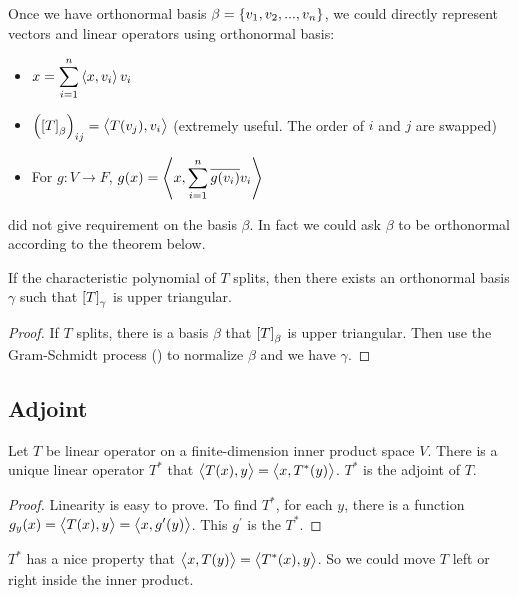 Once we have orthonormal basis $\beta = \set{v_1, v_2, ..., v_n}$,  we could directly represent vectors and linear operators using orthonormal basis:
\begin{itemize}
    \item $\displaystyle x = \sum_{i=1}^n \left\langle \displaystyle x, v_i \right\rangle v_i$
    \item $\left(\coordinate{T}_\beta\right)_{ij} = \innerproduct{T(v_j)}{v_i}$ (extremely useful. The order of $i$ and $j$ are swapped)
    \item For $g: V \rightarrow F$, $g(x) = \left\langle \displaystyle x, \sum_{i=1}^n \overline{g(v_i)} v_i \right\rangle$
\end{itemize}



 did not give requirement on the basis $\beta$. In fact we could ask $\beta$ to be orthonormal according to the theorem below.

\begin{theorem}[Schur]\label{schur_theorem}
    If the characteristic polynomial of $T$ splits, then there exists an orthonormal basis $\gamma$ such that $\coordinate{T}_\gamma$ is upper triangular.
\end{theorem}
\begin{proof}
    If $T$ splits, there is a basis $\beta$ that $\coordinate{T}_\beta$ is upper triangular. Then use the Gram-Schmidt process () to normalize $\beta$ and we have $\gamma$.
\end{proof}



\subsection{Adjoint}


\begin{definition}[Adjoint]\label{adjoint_operator_definition}
    Let $T$ be linear operator on a finite-dimension inner product space $V$. There is a unique linear operator $T^*$ that $\left\langle \displaystyle T(x), y \right\rangle = \left\langle \displaystyle x, T^* (y) \right\rangle$. $T^*$ is the adjoint of $T$.
\end{definition}
\begin{proof}
    Linearity is easy to prove. To find $T^*$, for each $y$, there is a function $g_y (x) = \left\langle \displaystyle T(x), y \right\rangle = \left\langle \displaystyle x, g^\prime (y) \right\rangle$. This $g^\prime$ is the $T^*$.
\end{proof}

$T^*$ has a nice property that $\left\langle \displaystyle x, T(y) \right\rangle = \left\langle \displaystyle T^* (x), y \right\rangle$. So we could move $T$ left or right inside the inner product.

